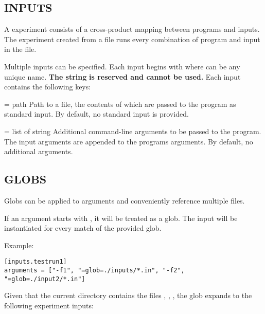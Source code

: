 \documentclass[a4paper,english]{article}
\begin{document}
\begin{adjustwidth}{18pt}{0pt}
    \section{INPUTS}

      A  experiment consists of a cross-product mapping between programs
      and inputs.
      The experiment created from a  file runs every combination
      of program and input in the file.

      Multiple inputs can be specified.
      Each input begins with  where  can be any unique name.
      \textbf{The string}  \textbf{is reserved and cannot be used.}
      Each input contains the following keys:

      \begin{Description}[Options]\setlength{\itemsep}{0cm}
          \item[\Opt{input?} = path]
            Path to a file, the contents of which are passed to the program as standard input.
            By default, no standard input is provided.
          \item[\Opt{arguments?} = list of string]
            Additional command-line arguments to be passed to the program.
            The input arguments are appended to the programs arguments.
            By default, no additional arguments.
      \end{Description}


      \subsection{GLOBS}

        Globs can be applied to arguments and conveniently reference multiple files.

          If an argument starts with , it will be treated as a glob.
          The input will be instantiated for every match of the provided glob.

            Example:

      \begin{verbatim}
[inputs.testrun1]
arguments = ["-f1", "=glob=./inputs/*.in", "-f2", "=glob=./input2/*.in"]
      \end{verbatim}

            Given that the current directory contains the files
            , , , the glob
            expands to the following experiment inputs:


\end{adjustwidth}
\end{document}
